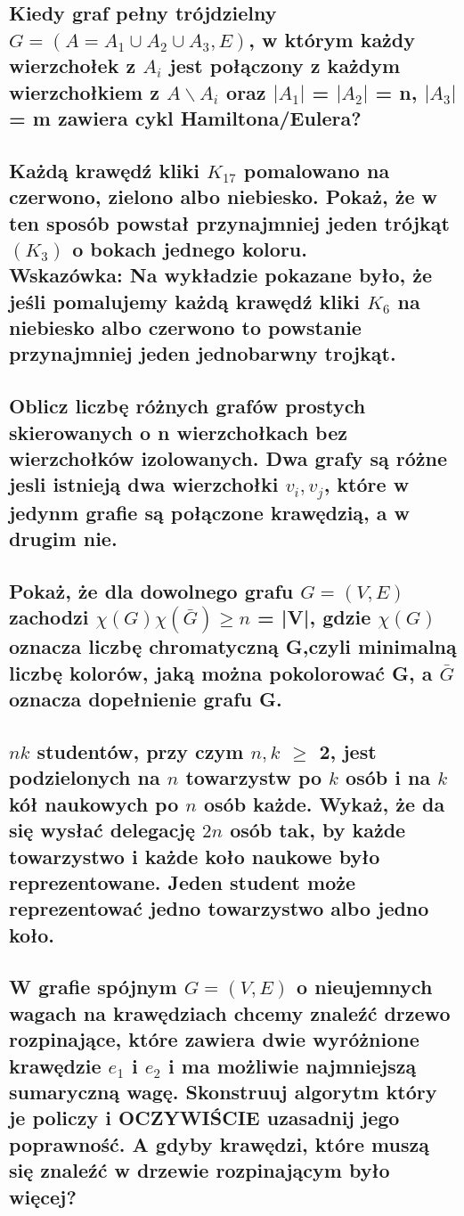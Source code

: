 \documentclass[12pt]{article}
\begin{document}
\subsection{Kiedy graf pełny trójdzielny $G = (A = A_1 \cup A_2 \cup A_3, E)$, w którym każdy wierzchołek z $A_i$ jest połączony z każdym wierzchołkiem z $A \backslash A_i$ oraz $|A_1|$ = $|A_2|$ = n, $|A_3|$ = m zawiera cykl Hamiltona/Eulera?}

\subsection{Każdą krawędź kliki $K_{17}$ pomalowano na czerwono, zielono albo niebiesko. Pokaż, że w ten sposób powstał przynajmniej jeden trójkąt $(K_3)$ o bokach jednego koloru. \\ Wskazówka: Na wykładzie pokazane było, że jeśli pomalujemy każdą krawędź kliki $K_6$ na niebiesko albo czerwono to powstanie przynajmniej jeden jednobarwny trojkąt.}

\subsection{Oblicz liczbę różnych grafów prostych skierowanych o n wierzchołkach bez wierzchołków izolowanych. Dwa grafy są różne jesli istnieją dwa wierzchołki $v_i, v_j$, które w jedynm grafie są połączone krawędzią, a w drugim nie.}

\subsection{Pokaż, że dla dowolnego grafu $G = (V,E)$ zachodzi $\chi(G)\chi(\bar{G}) \geq n$ = |V|, gdzie $\chi(G)$ oznacza liczbę chromatyczną G,czyli minimalną liczbę kolorów, jaką można pokolorować G, a $\bar{G}$ oznacza dopełnienie grafu G.}

\newpage

\subsection{$nk$ studentów, przy czym $n, k$ $\geq$ 2, jest podzielonych na $n$ towarzystw po $k$ osób i na $k$ kół naukowych po $n$ osób każde. Wykaż, że da się wysłać delegację $2n$ osób tak, by każde towarzystwo i każde koło naukowe było reprezentowane. Jeden student może reprezentować jedno towarzystwo albo jedno koło.}

\subsection{W grafie spójnym $G = (V, E)$ o nieujemnych wagach na krawędziach chcemy znaleźć drzewo rozpinające, które zawiera dwie wyróżnione krawędzie $e_1$ i $e_2$ i ma możliwie najmniejszą sumaryczną wagę. Skonstruuj algorytm który je policzy i OCZYWIŚCIE uzasadnij jego poprawność. A gdyby krawędzi, które muszą się znaleźć w drzewie rozpinającym było więcej?}
\end{document}
